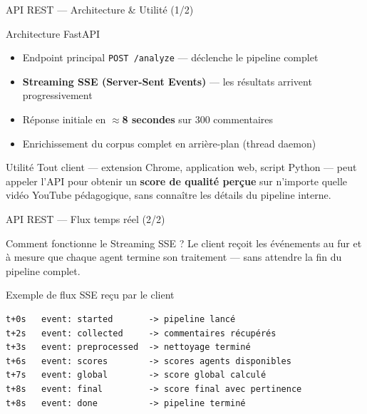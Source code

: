 \documentclass[aspectratio=169, 12pt]{beamer}
\begin{document}
\begin{frame}{API REST — Architecture \& Utilité (1/2)}

  \begin{block}{Architecture FastAPI}
    \begin{itemize}
      \item Endpoint principal \texttt{POST /analyze} — déclenche le pipeline complet
      \item \textbf{Streaming SSE (Server-Sent Events)} — les résultats arrivent progressivement
      \item Réponse initiale en \textbf{$\approx$8 secondes} sur 300 commentaires
      \item Enrichissement du corpus complet en arrière-plan (thread daemon)
    \end{itemize}
  \end{block}

  \vspace{0.4cm}

  \begin{block}{Utilité}
    \normalsize
    Tout client — extension Chrome, application web, script Python — peut
    appeler l'API pour obtenir un \textbf{score de qualité perçue} sur
    n'importe quelle vidéo YouTube pédagogique, sans connaître les détails
    du pipeline interne.
  \end{block}

\end{frame}

\begin{frame}[fragile]{API REST — Flux temps réel (2/2)}

  \begin{block}{Comment fonctionne le Streaming SSE ?}
    \normalsize
    Le client reçoit les événements au fur et à mesure que chaque agent
    termine son traitement — sans attendre la fin du pipeline complet.
  \end{block}

  \vspace{0.3cm}

  \begin{exampleblock}{Exemple de flux SSE reçu par le client}
    \lstset{basicstyle=\ttfamily\small}
    \begin{lstlisting}
t+0s   event: started       -> pipeline lancé
t+2s   event: collected     -> commentaires récupérés
t+3s   event: preprocessed  -> nettoyage terminé
t+6s   event: scores        -> scores agents disponibles
t+7s   event: global        -> score global calculé
t+8s   event: final         -> score final avec pertinence
t+8s   event: done          -> pipeline terminé
    \end{lstlisting}
  \end{exampleblock}

\end{frame}
\end{document}
